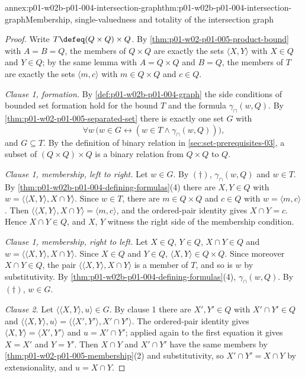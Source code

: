 \begin{annexitem}{annex:p01-w02b-p01-004-intersection-graph}{thm:p01-w02b-p01-004-intersection-graph}{Membership, single-valuedness and totality of the intersection graph}
\begin{proof}
Write \(T\defeq(Q\times Q)\times Q\). By
\cref{thm:p01-w02-p01-005-product-bound} with \(A=B=Q\), the members of
\(Q\times Q\) are exactly the sets \(\langle X,Y\rangle\) with \(X\in Q\) and
\(Y\in Q\); by the same lemma with \(A=Q\times Q\) and \(B=Q\), the members of
\(T\) are exactly the sets \(\langle m,c\rangle\) with \(m\in Q\times Q\) and
\(c\in Q\).

\emph{Clause 1, formation.} By \cref{def:p01-w02b-p01-004-graph} the side
conditions of bounded set formation hold for the bound \(T\) and the formula
\(\gamma_{\cap}(w,Q)\). By \cref{thm:p01-w02-p01-005-separated-set} there is
exactly one set \(G\) with
\begin{equation}
  \forall w\,\bigl(w\in G\leftrightarrow(w\in T\land\gamma_{\cap}(w,Q))\bigr),
  \tag{\(\dagger\)}
\end{equation}
and \(G\subseteq T\). By the definition of binary relation in
\cref{sec:set-prerequisites-03}, a subset of \((Q\times Q)\times Q\) is a binary
relation from \(Q\times Q\) to \(Q\).

\emph{Clause 1, membership, left to right.} Let \(w\in G\). By \((\dagger)\),
\(\gamma_{\cap}(w,Q)\) and \(w\in T\). By
\cref{thm:p01-w02b-p01-004-defining-formulas}(4) there are \(X,Y\in Q\) with
\(w=\langle\langle X,Y\rangle,X\cap Y\rangle\). Since \(w\in T\), there are
\(m\in Q\times Q\) and \(c\in Q\) with \(w=\langle m,c\rangle\). Then
\(\langle\langle X,Y\rangle,X\cap Y\rangle=\langle m,c\rangle\), and the
ordered-pair identity gives \(X\cap Y=c\). Hence \(X\cap Y\in Q\), and \(X\),
\(Y\) witness the right side of the membership condition.

\emph{Clause 1, membership, right to left.} Let \(X\in Q\), \(Y\in Q\),
\(X\cap Y\in Q\) and \(w=\langle\langle X,Y\rangle,X\cap Y\rangle\). Since
\(X\in Q\) and \(Y\in Q\), \(\langle X,Y\rangle\in Q\times Q\). Since moreover
\(X\cap Y\in Q\), the pair \(\langle\langle X,Y\rangle,X\cap Y\rangle\) is a
member of \(T\), and so is \(w\) by substitutivity. By
\cref{thm:p01-w02b-p01-004-defining-formulas}(4), \(\gamma_{\cap}(w,Q)\). By
\((\dagger)\), \(w\in G\).

\emph{Clause 2.} Let \(\langle\langle X,Y\rangle,u\rangle\in G\). By clause 1
there are \(X',Y'\in Q\) with \(X'\cap Y'\in Q\) and
\(\langle\langle X,Y\rangle,u\rangle=
\langle\langle X',Y'\rangle,X'\cap Y'\rangle\). The ordered-pair identity gives
\(\langle X,Y\rangle=\langle X',Y'\rangle\) and \(u=X'\cap Y'\); applied again
to the first equation it gives \(X=X'\) and \(Y=Y'\). Then \(X\cap Y\) and
\(X'\cap Y'\) have the same members by
\cref{thm:p01-w02-p01-005-membership}(2) and substitutivity, so
\(X'\cap Y'=X\cap Y\) by extensionality, and \(u=X\cap Y\).


\end{proof}
\end{annexitem}
